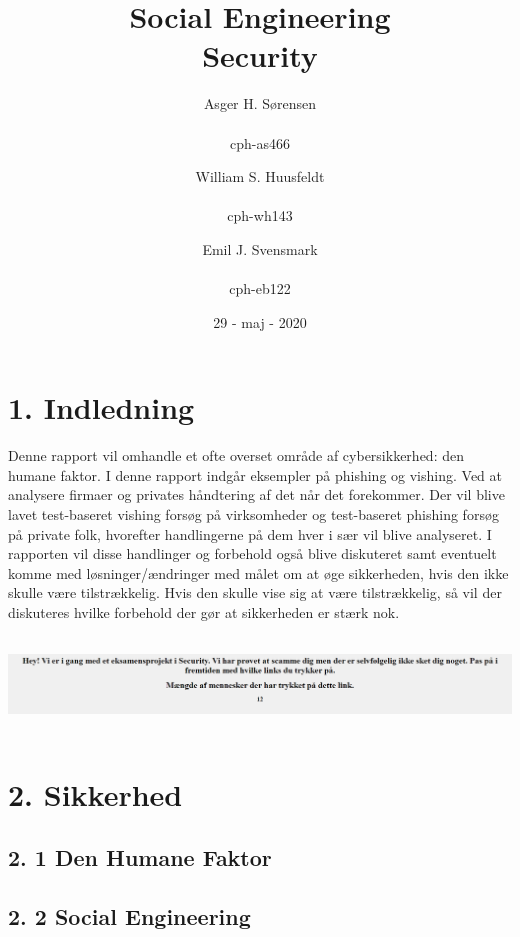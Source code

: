 \documentclass[11pt]{report}
\title{Social Engineering\\Security}
\author{
Asger H. Sørensen\\
\\cph-as466
\and
William S. Huusfeldt\\
\\cph-wh143
\and
Emil J. Svensmark\\
\\cph-eb122
}
\date{29 - maj - 2020}
\begin{document}
\maketitle
\renewcommand{\cftchapleader}{\cftdotfill{\cftdotsep}}
\tableofcontents
\newpage

\chapter*{1. Indledning}
Denne rapport vil omhandle et ofte overset område af cybersikkerhed: den humane faktor. I denne rapport indgår eksempler på phishing og vishing. Ved at analysere firmaer og privates håndtering af det når det forekommer. Der vil blive lavet test-baseret vishing forsøg på virksomheder og test-baseret phishing forsøg på private folk, hvorefter handlingerne på dem hver i sær vil blive analyseret. I rapporten vil disse handlinger og forbehold også blive diskuteret samt eventuelt komme med løsninger/ændringer med målet om at øge sikkerheden, hvis den ikke skulle være tilstrækkelig. Hvis den skulle vise sig at være tilstrækkelig, så vil der diskuteres hvilke forbehold der gør at sikkerheden er stærk nok. 

\begin{center}
\includegraphics[height=2.5cm, width=17cm]{Capture}
\end{center}

\chapter*{2. Sikkerhed}

\section*{2. 1 Den Humane Faktor}

\section*{2. 2 Social Engineering}
\end{document}
